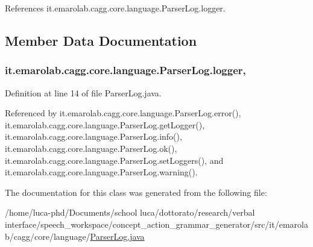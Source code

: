References it.\-emarolab.\-cagg.\-core.\-language.\-Parser\-Log.\-logger.



\subsection{Member Data Documentation}
\hypertarget{classit_1_1emarolab_1_1cagg_1_1core_1_1language_1_1ParserLog_a9edf0e5c8ec3d774275c915ff7bd65c4}{
\subsubsection[{logger}]{ it.\-emarolab.\-cagg.\-core.\-language.\-Parser\-Log.\-logger\hspace{0.3cm}{\ttfamily [static]}, {\ttfamily [private]}}}\label{classit_1_1emarolab_1_1cagg_1_1core_1_1language_1_1ParserLog_a9edf0e5c8ec3d774275c915ff7bd65c4}


Definition at line 14 of file Parser\-Log.\-java.



Referenced by it.\-emarolab.\-cagg.\-core.\-language.\-Parser\-Log.\-error(), it.\-emarolab.\-cagg.\-core.\-language.\-Parser\-Log.\-get\-Logger(), it.\-emarolab.\-cagg.\-core.\-language.\-Parser\-Log.\-info(), it.\-emarolab.\-cagg.\-core.\-language.\-Parser\-Log.\-ok(), it.\-emarolab.\-cagg.\-core.\-language.\-Parser\-Log.\-set\-Loggers(), and it.\-emarolab.\-cagg.\-core.\-language.\-Parser\-Log.\-warning().



The documentation for this class was generated from the following file\-:\begin{DoxyCompactItemize}
\item 
/home/luca-\/phd/\-Documents/school luca/dottorato/research/verbal interface/speech\-\_\-workspace/concept\-\_\-action\-\_\-grammar\-\_\-generator/src/it/emarolab/cagg/core/language/\hyperlink{ParserLog_8java}{Parser\-Log.\-java}\end{DoxyCompactItemize}
